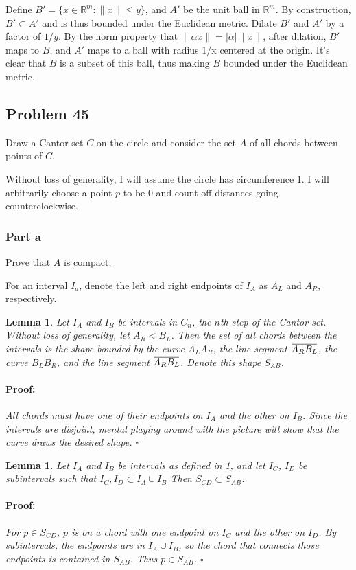 \documentclass{article}
\newenvironment{proof}{\paragraph{Proof:}}{\hfill$\square$}
\newtheorem{lemma}[theorem]{Lemma}
\newcommand{\overbar}[1]{\mkern 1.5mu\overline{\mkern-1.5mu#1\mkern-1.5mu}\mkern 1.5mu}
\begin{document}
Define $B' = \{x \in \mathbb{R}^m : \|x\| \leq y\}$, and $A'$ be the unit ball in $\mathbb{R}^m$. By construction, $B' \subset A'$ and is thus bounded under the Euclidean metric. Dilate $B'$ and $A'$ by a factor of $1/y$. By the norm property that $\|\alpha x \| = |\alpha| \|x\|$, after dilation, $B'$ maps to $B$, and $A'$ maps to a ball with radius 1/x centered at the origin. It's clear that $B$ is a subset of this ball, thus making $B$ bounded under the Euclidean metric.

\subsection*{Problem 45}
Draw a Cantor set $C$ on the circle and consider the set $A$ of all chords between points of $C$.

Without loss of generality, I will assume the circle has circumference 1. I will arbitrarily choose a point $p$ to be $0$ and count off distances going counterclockwise.
\subsubsection*{Part a}
Prove that $A$ is compact.

For an interval $I_a$, denote the left and right endpoints of $I_A$ as $A_L$ and $A_R$, respectively.
\begin{lemma}
\label{TwoIntervalChords}
Let $I_A$ and $I_B$ be intervals in $C_n$, the $n$th step of the Cantor set. Without loss of generality, let $A_R < B_L$. Then the set of all chords between the intervals is the shape bounded by the curve $A_L A_R$, the line segment $\overbar{A_R B_L}$, the curve $B_L B_R$, and the line segment $\overbar{A_R B_L}$. Denote this shape $S_{AB}$.
\begin{proof}
All chords must have one of their endpoints on $I_A$ and the other on $I_B$. Since the intervals are disjoint, mental playing around with the picture will show that the curve draws the desired shape.
\end{proof}
\end{lemma}

\begin{lemma}
\label{SubintervalChords}
Let $I_A$ and $I_B$ be intervals as defined in \ref{TwoIntervalChords}, and let $I_C$, $I_D$ be subintervals such that $I_C, I_D \subset I_A \cup I_B$ Then $S_{CD} \subset S_{AB}$.
\begin{proof}
For $p \in S_{CD}$, $p$ is on a chord with one endpoint on $I_C$ and the other on $I_D$. By subintervals, the endpoints are in $I_A \cup I_B$, so the chord that connects those endpoints is contained in $S_{AB}$. Thus $p \in S_{AB}$.
\end{proof}
\end{lemma}
\end{document}
